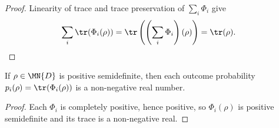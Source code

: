 \begin{proof}
    \leanok
    Linearity of trace and trace preservation of $\sum_i\Phi_i$ give
    \begin{align}
        \sum_i\tr(\Phi_i(\rho))
        &=\tr\left(\left(\sum_i\Phi_i\right)(\rho)\right)
         =\tr(\rho).
        \notag
    \end{align}
\end{proof}

\begin{theorem}
    \label{thm:instrument_probability_nonneg}
    \leanok
    If $\rho\in\MN{D}$ is positive semidefinite, then each outcome
    probability $p_i(\rho)=\tr(\Phi_i(\rho))$ is a
    non-negative real number.
\end{theorem}

\begin{proof}
    \leanok
    Each $\Phi_i$ is completely positive, hence positive, so
    $\Phi_i(\rho)$ is positive semidefinite and its trace is a
    non-negative real.
\end{proof}

